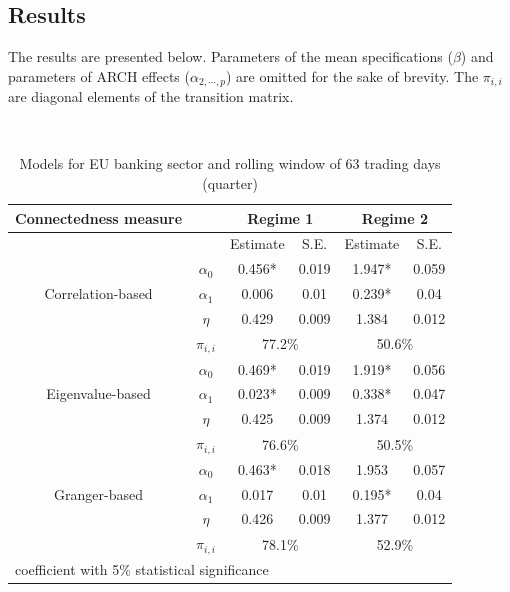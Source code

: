 \documentclass{article}
\begin{document}
\subsection*{Results}

The results are presented below. Parameters of the mean specifications ($\beta$) and parameters of ARCH effects ($\alpha_{2,\cdots,p}$) are omitted for the sake of brevity. The $\pi_{i,i}$ are diagonal elements of the transition matrix.

\

\begin{table}
\caption{Models for EU banking sector and rolling window of 63 trading days (quarter)}
\begin{tabular}{cccccc}
  \toprule
   Connectedness measure &  & \multicolumn{2}{c}{\bfseries Regime 1} & \multicolumn{2}{c}{\bfseries Regime 2}  \\
   \hline
   & & Estimate & S.E. & Estimate & S.E. \\
   \hline
   \multirow{3}{*}[\normalbaselineskip]{Correlation-based} & $\alpha_0$ & 0.456* & 0.019 & 1.947*  & 0.059 \\
    & $\alpha_1$ & 0.006 & 0.01 & 0.239* & 0.04 \\
    & $\eta$ & 0.429 & 0.009 & 1.384 & 0.012 \\
    & $\pi_{i,i}$ &  \multicolumn{2}{c}{77.2\%} & \multicolumn{2}{c}{50.6\%}\\
    \hline
    \multirow{3}{*}[\normalbaselineskip]{Eigenvalue-based} & $\alpha_0$ & 0.469* & 0.019 & 1.919*  & 0.056 \\
    & $\alpha_1$ & 0.023* & 0.009 & 0.338* & 0.047 \\
    & $\eta$ & 0.425 & 0.009 & 1.374 & 0.012 \\
    & $\pi_{i,i}$ &  \multicolumn{2}{c}{76.6\%} & \multicolumn{2}{c}{50.5\%}\\
    \hline
    \multirow{3}{*}[\normalbaselineskip]{Granger-based} & $\alpha_0$ & 0.463* & 0.018 & 1.953  & 0.057 \\
    & $\alpha_1$ & 0.017 & 0.01 & 0.195* & 0.04 \\
    & $\eta$ & 0.426 & 0.009 & 1.377 & 0.012 \\
    & $\pi_{i,i}$ &  \multicolumn{2}{c}{78.1\%} & \multicolumn{2}{c}{52.9\%}\\
    \hline
  \multicolumn{6}{l}{\footnotesize * coefficient with 5\% statistical significance} \\
  \hline
\end{tabular}
\end{table}
\end{document}
